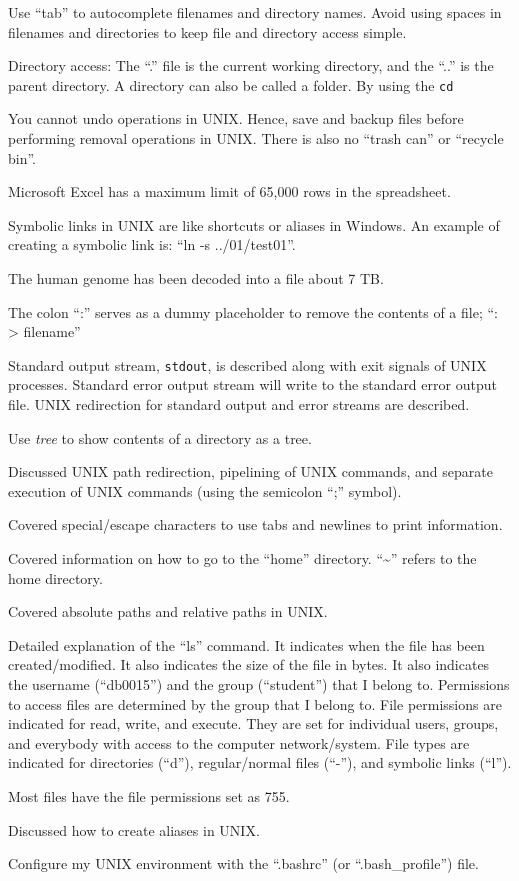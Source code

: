 Use ``tab'' to autocomplete filenames and directory names. Avoid using spaces in filenames and directories to keep file and directory access simple.

Directory access: The ``.'' file is the current working directory, and the ``..'' is the parent directory. A directory can also be called a folder. By using the {\tt cd}

You cannot undo operations in UNIX. Hence, save and backup files before performing removal operations in UNIX. There is also no ``trash can'' or ``recycle bin''.

Microsoft Excel has a maximum limit of 65,000 rows in the spreadsheet.

Symbolic links in UNIX are like shortcuts or aliases in Windows. An example of creating a symbolic link is: ``ln -s ../01/test01''.

The human genome has been decoded into a file about 7 TB.

The colon ``:'' serves as a dummy placeholder to remove the contents of a file; ``: > filename''

Standard output stream, {\tt stdout}, is described along with exit signals of UNIX processes. Standard error output stream will write to the standard error output file. UNIX redirection for standard output and error streams are described.

Use {\it tree} to show contents of a directory as a tree.

Discussed UNIX path redirection, pipelining of UNIX commands, and separate execution of UNIX commands (using the semicolon ``;'' symbol).

Covered special/escape characters to use tabs and newlines to print information.

Covered information on how to go to the ``home'' directory. ``\sim'' refers to the home directory.


Covered absolute paths and relative paths in UNIX.

Detailed explanation of the ``ls'' command. It indicates when the file has been created/modified. It also indicates the size of the file in bytes. It also indicates the username (``db0015'') and the group (``student'') that I belong to. Permissions to access files are determined by the group that I belong to. File permissions are indicated for read, write, and execute. They are set for individual users, groups, and everybody with access to the computer network/system. File types are indicated for directories (``d''), regular/normal files (``-''), and symbolic links (``l'').

Most files have the file permissions set as 755.

Discussed how to create aliases in UNIX.

Configure my UNIX environment with the ``.bashrc'' (or ``.bash_profile'') file.















